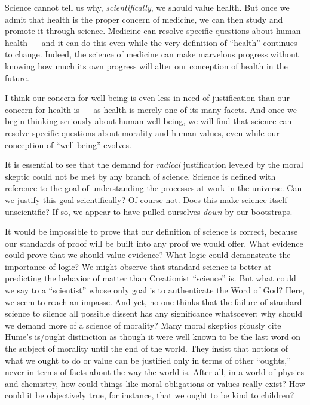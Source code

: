 \documentclass[a4paper,14pt]{extarticle}
\begin{document}
Science cannot tell us why, \textit{scientifically}, we should value health.
But once we admit that health is the proper concern of medicine, we can then study and promote it through science.
Medicine can resolve specific questions about human health --- and it can do this even while the very definition of ``health'' continues to change.
Indeed, the science of medicine can make marvelous progress without knowing how much its own progress will alter our conception of health in the future.

I think our concern for well-being is even less in need of justification than our concern for health is --- as health is merely one of its many facets.
And once we begin thinking seriously about human well-being, we will find that science can resolve specific questions about morality and human values, even while our conception of ``well-being'' evolves.

It is essential to see that the demand for \textit{radical} justification leveled by the moral skeptic could not be met by any branch of science.
Science is defined with reference to the goal of understanding the processes at work in the universe.
Can we justify this goal scientifically?
Of course not.
Does this make science itself unscientific?
If so, we appear to have pulled ourselves \textit{down} by our bootstraps.

It would be impossible to prove that our definition of science is correct, because our standards of proof will be built into any proof we would offer.
What evidence could prove that we should value evidence?
What logic could demonstrate the importance of logic?
We might observe that standard science is better at predicting the behavior of matter than Creationist ``science'' is.
But what could we say to a ``scientist'' whose only goal is to authenticate the Word of God?
Here, we seem to reach an impasse.
And yet, no one thinks that the failure of standard science to silence all possible dissent has any significance whatsoever;
why should we demand more of a science of morality?
Many moral skeptics piously cite Hume's is/ought distinction as though it were well known to be the last word on the subject of morality until the end of the world.
They insist that notions of what we ought to do or value can be justified only in terms of other ``oughts,'' never in terms of facts about the way the world is.
After all, in a world of physics and chemistry, how could things like moral obligations or values really exist?
How could it be objectively true, for instance, that we ought to be kind to children?
\end{document}
